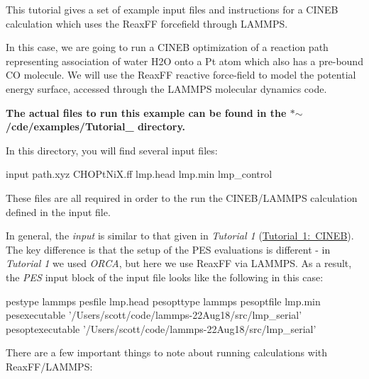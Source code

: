This tutorial gives a set of example input files and instructions for a C\+I\+N\+EB calculation which uses the Reax\+FF forcefield through L\+A\+M\+M\+PS.

In this case, we are going to run a C\+I\+N\+EB optimization of a reaction path representing association of water H2O onto a Pt atom which also has a pre-\/bound CO molecule. We will use the Reax\+FF reactive force-\/field to model the potential energy surface, accessed through the L\+A\+M\+M\+PS molecular dynamics code.

{\bfseries{The actual files to run this example can be found in the $\ast$$\sim$/cde/examples/\+Tutorial\+\_ directory.}}

In this directory, you will find several input files\+: \begin{DoxyVerb}  input
  path.xyz
  CHOPtNiX.ff
  lmp.head
  lmp.min
  lmp_control
\end{DoxyVerb}


These files are all required in order to the run the C\+I\+N\+E\+B/\+L\+A\+M\+M\+PS calculation defined in the input file.

In general, the {\itshape input} is similar to that given in {\itshape Tutorial 1} (\mbox{\hyperlink{_tutorial1}{Tutorial 1\+: C\+I\+N\+EB}}). The key difference is that the setup of the P\+ES evaluations is different -\/ in {\itshape Tutorial 1} we used {\itshape O\+R\+CA}, but here we use Reax\+FF via L\+A\+M\+M\+PS. As a result, the {\itshape P\+ES} input block of the input file looks like the following in this case\+: \begin{DoxyVerb}pestype  lammps
pesfile   lmp.head
pesopttype  lammps
pesoptfile lmp.min
pesexecutable '/Users/scott/code/lammps-22Aug18/src/lmp_serial'
pesoptexecutable '/Users/scott/code/lammps-22Aug18/src/lmp_serial'
\end{DoxyVerb}


There are a few important things to note about running calculations with Reax\+F\+F/\+L\+A\+M\+M\+PS\+:


